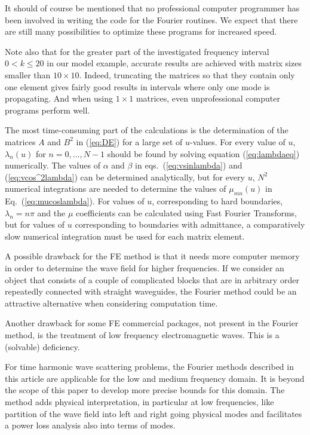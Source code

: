 \documentclass[numreferences]{kluwer}
\begin{document}
It should of course be mentioned that no professional computer
programmer has been involved in writing the code for the Fourier
routines. We expect that there are still many possibilities to optimize
these programs for increased speed.

Note also that
for the greater part of the investigated frequency interval $0<k\le20$
in our model example, accurate results are achieved with matrix sizes
smaller than $10\times10$. Indeed,
truncating the matrices so that they contain only one
element gives fairly good results in intervals where only one
mode is propagating. And when using $1\times1$ matrices, even
unprofessional computer programs perform well.

The most time-consuming part of the calculations is the determination
of the matrices $A$ and $B^2$ in (\ref{eq:DE}) for a large set of
$u$-values. For every value of $u$, $\lambda_n(u)$ for $n=0,\dots,N-1$
should be found by solving equation (\ref{eq:lambdaeq}) numerically.
The values of $\alpha$ and $\beta$ in eqs.~(\ref{eq:vsinlambda}) and
(\ref{eq:vcos^2lambda}) can be determined analytically, but for every
$u$, $N^2$ numerical integrations are needed to determine the values
of $\mu_{mn}(u)$ in Eq.~(\ref{eq:mucoslambda}). For values of $u$,
corresponding to hard boundaries, $\lambda_n=n\pi$ and the $\mu$
coefficients can be calculated using Fast Fourier Transforms, but for
values of $u$ corresponding to boundaries with admittance, a
comparatively slow numerical integration must be used for each matrix
element.

A possible drawback for the FE method is that it needs more computer
memory in order to determine the wave field for higher frequencies.
If we consider an object that consists of a couple of complicated
blocks that are in arbitrary order repeatedly connected with straight
waveguides, the Fourier method could be an attractive alternative when
considering computation time.

Another drawback for some FE commercial packages, not present in the
Fourier method, is the treatment of low frequency
electromagnetic waves. This is a (solvable)
\cite{AndriulliCoolsOlyslagerMichielssen2008,chew2014} deficiency.

For time harmonic wave scattering problems, the Fourier methods
described in this article are applicable for the low and medium
frequency domain. It is beyond the scope of this paper to develop more
precise bounds for this domain. The method adds physical
interpretation, in particular at low frequencies, like partition of
the wave field into left and right going physical modes and
facilitates a power loss analysis also into terms of modes.
\end{document}

